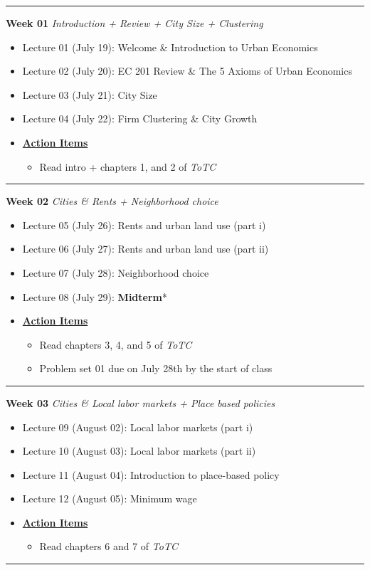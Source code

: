 \documentclass[11pt]{article}
\begin{document}
	\noindent\rule[0.5ex]{\linewidth}{1pt}
	\textbf{Week 01} \textit{Introduction + Review + City Size + Clustering}
	\begin{itemize}
		\item Lecture 01 (July 19): Welcome \& Introduction to Urban Economics
		\item Lecture 02 (July 20): EC 201 Review \& The 5 Axioms of Urban Economics
		\item Lecture 03 (July 21): City Size
		\item Lecture 04 (July 22):  Firm Clustering \& City Growth
		\item[]\underline{\textbf{Action Items}}
		\begin{itemize}
			\item Read intro + chapters 1, and 2 of \textit{ToTC}
		\end{itemize}
	\end{itemize}
	\noindent\rule[0.5ex]{\linewidth}{1pt}
	
	\textbf{Week 02} \textit{Cities \& Rents + Neighborhood choice}
	\begin{itemize}
		\item Lecture 05 (July 26): Rents and urban land use (part i)
		\item Lecture 06 (July 27): Rents and urban land use (part ii)
		\item Lecture 07 (July 28): Neighborhood choice 
		\item Lecture 08 (July 29):  \textbf{Midterm}*
		\item[]\underline{\textbf{Action Items}}
		\begin{itemize}
				\item Read chapters 3, 4, and 5 of \textit{ToTC}
				\item Problem set 01 due on July 28th by the start of class
		\end{itemize}
	\end{itemize}
	\noindent\rule[0.5ex]{\linewidth}{1pt}
	
		\textbf{Week 03} \textit{Cities \& Local labor markets + Place based policies}
	\begin{itemize}
		\item Lecture 09 (August 02): Local labor markets (part i)
		\item Lecture 10 (August 03): Local labor markets (part ii)
		\item Lecture 11 (August 04): Introduction to place-based policy
		\item Lecture 12 (August 05): Minimum wage
		\item[]\underline{\textbf{Action Items}}
		\begin{itemize}
				\item Read chapters 6 and 7 of \textit{ToTC}
		\end{itemize}
	\end{itemize}
	\noindent\rule[0.5ex]{\linewidth}{1pt}
	
\end{document}

